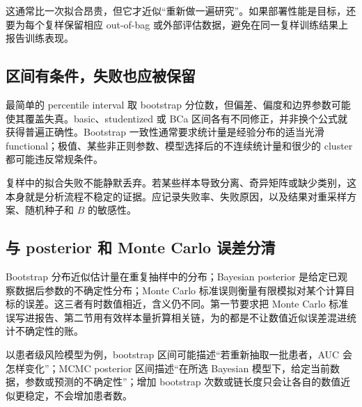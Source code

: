 这通常比一次拟合昂贵，但它才近似``重新做一遍研究''。如果部署性能是目标，还要为每个复样保留相应 out-of-bag 或外部评估数据，避免在同一复样训练结果上报告训练表现。

\subsection{区间有条件，失败也应被保留}

最简单的 percentile interval 取 bootstrap 分位数，但偏差、偏度和边界参数可能使其覆盖失真。basic、studentized 或 BCa 区间各有不同修正，并非换个公式就获得普遍正确性。Bootstrap 一致性通常要求统计量是经验分布的适当光滑 functional；极值、某些非正则参数、模型选择后的不连续统计量和很少的 cluster 都可能违反常规条件。

复样中的拟合失败不能静默丢弃。若某些样本导致分离、奇异矩阵或缺少类别，这本身就是分析流程不稳定的证据。应记录失败率、失败原因，以及结果对重采样方案、随机种子和 \(B\) 的敏感性。

\subsection{与 posterior 和 Monte Carlo 误差分清}

Bootstrap 分布近似估计量在重复抽样中的分布；Bayesian posterior 是给定已观察数据后参数的不确定性分布；Monte Carlo 标准误则衡量有限模拟对某个计算目标的误差。这三者有时数值相近，含义仍不同。第一节要求把 Monte Carlo 标准误写进报告、第二节用有效样本量折算相关链，为的都是不让数值近似误差混进统计不确定性的账。

以患者级风险模型为例，bootstrap 区间可能描述``若重新抽取一批患者，AUC 会怎样变化''；MCMC posterior 区间描述``在所选 Bayesian 模型下，给定当前数据，参数或预测的不确定性''；增加 bootstrap 次数或链长度只会让各自的数值近似更稳定，不会增加患者数。
